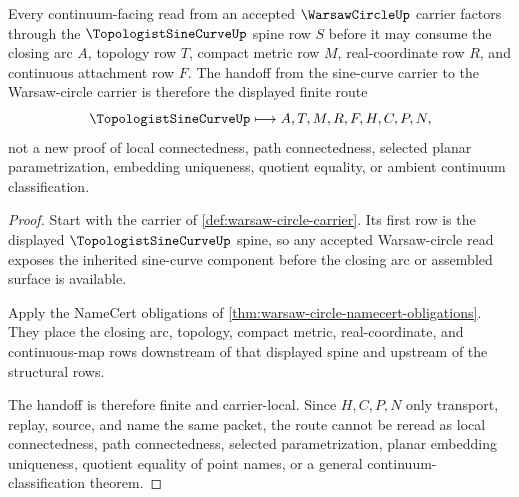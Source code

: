 \begin{theorem}
\label{thm:warsaw-circle-sine-curve-closure-handoff}
Every continuum-facing read from an accepted $\WarsawCircleUp$ carrier factors through the $\TopologistSineCurveUp$ spine row $S$ before it may consume the closing arc $A$, topology row $T$, compact metric row $M$, real-coordinate row $R$, and continuous attachment row $F$. The handoff from the sine-curve carrier to the Warsaw-circle carrier is therefore the displayed finite route
$$
\TopologistSineCurveUp \longmapsto A,T,M,R,F,H,C,P,N ,
$$
not a new proof of local connectedness, path connectedness, selected planar parametrization, embedding uniqueness, quotient equality, or ambient continuum classification.
\end{theorem}
\begin{proof}
Start with the carrier of \autoref{def:warsaw-circle-carrier}. Its first row is the displayed $\TopologistSineCurveUp$ spine, so any accepted Warsaw-circle read exposes the inherited sine-curve component before the closing arc or assembled surface is available.

Apply the NameCert obligations of \autoref{thm:warsaw-circle-namecert-obligations}. They place the closing arc, topology, compact metric, real-coordinate, and continuous-map rows downstream of that displayed spine and upstream of the structural rows.

The handoff is therefore finite and carrier-local. Since $H,C,P,N$ only transport, replay, source, and name the same packet, the route cannot be reread as local connectedness, path connectedness, selected parametrization, planar embedding uniqueness, quotient equality of point names, or a general continuum-classification theorem.
\end{proof}



